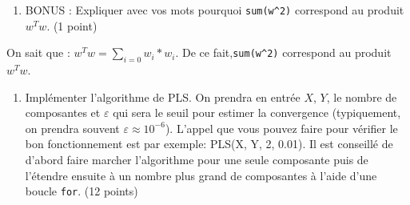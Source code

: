 \documentclass[
]{article}
\providecommand{\tightlist}{%
  \setlength{\itemsep}{0pt}\setlength{\parskip}{0pt}}
\begin{document}
\begin{enumerate}
\def\labelenumi{\arabic{enumi}.}
\setcounter{enumi}{-1}
\tightlist
\item
  BONUS : Expliquer avec vos mots pourquoi \texttt{sum(w\^{}2)}
  correspond au produit \(w^Tw\). (1 point)
\end{enumerate}

On sait que : \(w^Tw = \sum_{i=0}w_{i }*w_{i }\). De ce
fait,\texttt{sum(w\^{}2)} correspond au produit \(w^Tw\).

\begin{enumerate}
\def\labelenumi{\arabic{enumi}.}
\tightlist
\item
  Implémenter l'algorithme de PLS. On prendra en entrée \(X\), \(Y\), le
  nombre de composantes et \(\varepsilon\) qui sera le seuil pour
  estimer la convergence (typiquement, on prendra souvent
  \(\varepsilon \approx 10^{-6}\)). L'appel que vous pouvez faire pour
  vérifier le bon fonctionnement est par exemple: PLS(X, Y, 2, 0.01). Il
  est conseillé de d'abord faire marcher l'algorithme pour une seule
  composante puis de l'étendre ensuite à un nombre plus grand de
  composantes à l'aide d'une boucle \texttt{for}. (12 points)
\end{enumerate}
\end{document}
